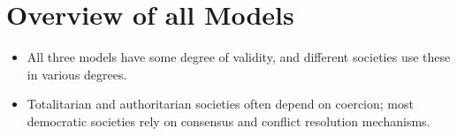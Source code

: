 \documentclass{article}
\begin{document}
\section{Overview of all Models}
\begin{itemize}
    \item All three models have some degree of validity, and different societies use these in various degrees.
    \item Totalitarian and authoritarian societies often depend on coercion; most democratic societies rely on consensus and conflict resolution mechanisms.
\end{itemize}
\end{document}
